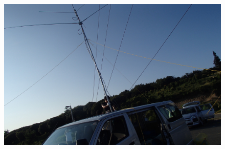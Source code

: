 \begin{frame}
\begin{columns}
\begin{column}{0.48\textwidth}
\begin{figure}[htbp]
\begin{center}
                    \includegraphics[width=.9\hsize]{pic/pic6.JPG}
                \end{center}
            \end{figure}
        \end{column}
    \end{columns}
\end{frame}

